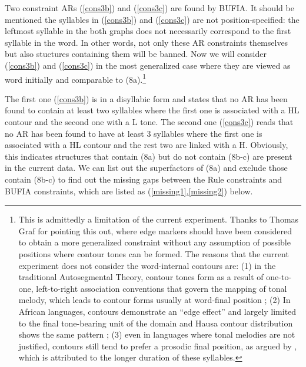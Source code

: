 \documentclass[11pt,letterpaper]{article}
\begin{document}
Two constraint ARs (\ref{cons3b}) and  (\ref{cons3c}) are found by BUFIA. It should be mentioned the syllables in (\ref{cons3b}) and  (\ref{cons3c}) are not position-specified: the leftmost syllable in the both graphs does not necessarily correspond to the first syllable in the word. In other words, not only these AR constraints themselves but also stuctures containing them will be banned. Now we will consider (\ref{cons3b}) and  (\ref{cons3c}) in the most generalized case where they are viewed as word initially and comparable to (8a).\footnote{This is admittedly a limitation of the current experiment. Thanks to Thomas Graf for pointing this out, where edge markers should have been considered to obtain a more generalized constraint without any assumption of possible positions where contour tones can be formed. The reasons that the current experiment does not consider the word-internal contours are: (1) in the traditional Autosegmental Theory, contour tones form as a result of one-to-one, left-to-right association conventions that govern the mapping of tonal melody, which leads to contour forms usually at word-final position \citep{goldsmith1976autosegmental}; (2) In African languages, contours demonstrate an ``edge effect'' and largely limited to the final tone-bearing unit of the domain \citep{yip1989contour} and Hausa contour distribution shows the same pattern \citep{Newmanbook}; (3) even in languages where tonal melodies are not justified, contours still tend to prefer a prosodic final position, as argued by \cite{zhang2009contour}, which is attributed to the longer duration of these syllables.}
	

The first one (\ref{cons3b}) is in a disyllabic form and states that no AR has been found to contain at least two syllables where the first one is associated with a HL contour and the second one with a L tone. The second one (\ref{cons3c}) reads that no AR has been found to have at least 3 syllables where the first one is associated with a HL contour and the rest two are linked with a H. Obviously, this indicates structures that contain (8a) but do not contain (8b-c) are present in the current data. We can list out the superfactors of (8a) and exclude those contain (8b-c) to find out the missing gaps between the Rule constraints and BUFIA constraints, which are listed as (\ref{missing1},\ref{missing2}) below.
\end{document}
